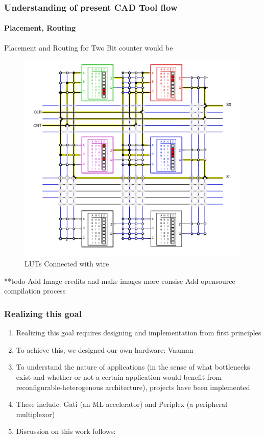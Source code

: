 \documentclass{beamer}
\begin{document}
\begin{frame}[fragile]
    \frametitle{Understanding of present CAD Tool flow}
    \framesubtitle{Placement, Routing}
    
         Placement and Routing for Two Bit counter would be 
         
\begin{figure}
        \centering
        \includegraphics[width=0.5\linewidth]{slides/images/fpga_luts.png}
        \caption{LUTs Connected with wire  }
        \label{exa_interconnect}
    \end{figure}
       **todo Add Image credits and make images more consise 
       Add opensource compilation process 
\end{frame}


\begin{frame}[fragile]
  \frametitle{Realizing this goal}
  \begin{enumerate}
    \item Realizing this goal requires designing and implementation from
      first principles
    \item To achieve this, we designed our own hardware: Vaaman
    \item To understand the nature of applications (in the sense of what
      bottlenecks exist and whether or not a certain application would
      benefit from reconfigurable-heterogenous architecture), projects have been implemented
    \item These include: Gati (an ML accelerator) and Periplex (a peripheral
      multiplexor)
    \item Discussion on this work follows:
  \end{enumerate}
  \framesubtitle{}
\end{frame}
\end{document}
